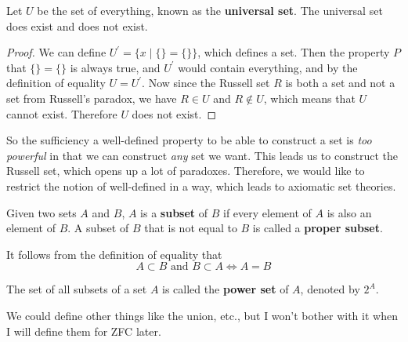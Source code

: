 \begin{theorem}
  Let $U$ be the set of everything, known as the \textbf{universal set}. The universal set does exist and does not exist. 
\end{theorem}
\begin{proof}
  We can define $U^\prime = \{x \mid \{\} = \{\} \}$, which defines a set. Then the property $P$ that $\{\} = \{\}$ is always true, and $U^\prime$ would contain everything, and by the definition of equality $U = U^\prime$. Now since the Russell set $R$ is both a set and not a set from Russell's paradox, we have $R \in U$ and $R \not\in U$, which means that $U$ cannot exist. Therefore $U$ does not exist. 
\end{proof}

So the sufficiency a well-defined property to be able to construct a set is \textit{too powerful} in that we can construct \textit{any} set we want. This leads us to construct the Russell set, which opens up a lot of paradoxes. Therefore, we would like to restrict the notion of well-defined in a way, which leads to axiomatic set theories. 

\begin{definition}[Subsets]
  Given two sets $A$ and $B$, $A$ is a \textbf{subset} of $B$ if every element of $A$ is also an element of $B$. A subset of $B$ that is not equal to $B$ is called a \textbf{proper subset}. 
\end{definition}

\begin{theorem}[Equality]
  It follows from the definition of equality that 
  \begin{equation}
    A \subset B \text{ and } B \subset A \iff A = B
  \end{equation}
\end{theorem}

\begin{definition}
  The set of all subsets of a set $A$ is called the \textbf{power set} of $A$, denoted by $2^A$. 
\end{definition}

We could define other things like the union, etc., but I won't bother with it when I will define them for ZFC later.  


